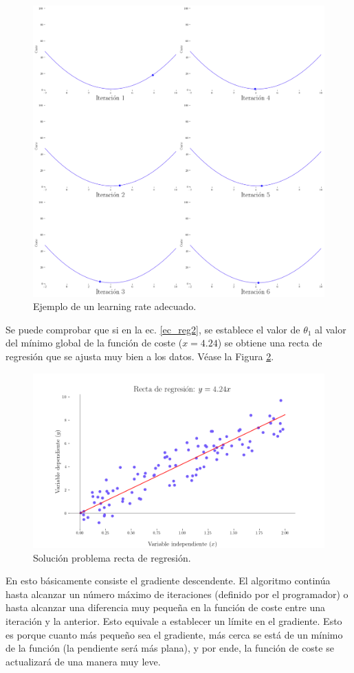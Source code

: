 \begin{figure}[H]
    \centering
    \includegraphics[scale = 0.25]{imgs/lr_adecuado.png}
    \caption{Ejemplo de un learning rate adecuado.}
    \label{lr_adecuado}
\end{figure}

Se puede comprobar que si en la ec. \ref{ec_reg2}, se establece el valor de $\theta_1$ al valor del mínimo global de la función de coste ($x = 4.24$) se obtiene una recta de regresión que se ajusta muy bien a los datos. Véase la Figura \ref{sol_rect_reg}.

\begin{figure}[H]
    \centering
    \includegraphics[scale = 0.45]{imgs/sol_rect_reg.png}
    \caption{Solución problema recta de regresión.}
    \label{sol_rect_reg}
\end{figure}
En esto básicamente consiste el gradiente descendente. El algoritmo continúa hasta alcanzar un número máximo de iteraciones (definido por el programador) o hasta alcanzar una diferencia muy pequeña en la función de coste entre una iteración y la anterior. Esto equivale a establecer un límite en el gradiente. Esto es porque cuanto más pequeño sea el gradiente, más cerca se está de un mínimo de la función (la pendiente será más plana), y por ende, la función de coste se actualizará de una manera muy leve.

